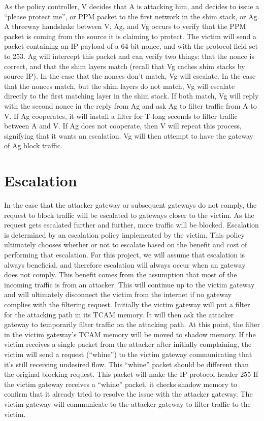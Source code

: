 \documentclass[11pt]{article}
\begin{document}
As the policy controller, V decides that A is attacking him, and decides to
issue a “please protect me”, or PPM packet to the first network in the shim
stack, or Ag. A threeway handshake between V, Ag, and Vg occurs to verify that
the PPM packet is coming from the source it is claiming to protect. The victim
will send a packet containing an IP payload of a 64 bit nonce, and with the
protocol field set to 253. Ag will intercept this packet and can verify two
things: that the nonce is correct, and that the shim layers match (recall that
Vg caches shim stacks by source IP). In the case that the nonces don’t match,
Vg will escalate. In the case that the nonces match, but the shim layers do not
match, Vg will escalate directly to the first matching layer in the shim stack.
If both match, Vg will reply with the second nonce in the reply from Ag and ask
Ag to filter traffic from A to V. If Ag cooperates, it will install a filter
for T-long seconds to filter traffic between A and V. If Ag does not cooperate,
then V will repeat this process, signifying that it wants an escalation. Vg
will then attempt to have the gateway of Ag block traffic. 


\section{Escalation}
In the case that the attacker gateway or subsequent gateways do not comply, the
request to block traffic will be escalated to gateways closer to the victim. As
the request gets escalated further and further, more traffic will be blocked.
Escalation is determined by an escalation policy implemented by the victim.
This policy ultimately chooses whether or not to escalate based on the benefit
and cost of performing that escalation. For this project, we will assume that
escalation is always beneficial, and therefore escalation will always occur
when an gateway does not comply. This benefit comes from the assumption that
most of the incoming traffic is from an attacker. This will continue up to the
victim gateway and will ultimately disconnect the victim from the internet if
no gateway complies with the filtering request. Initially the victim gateway
will put a filter for the attacking path in its TCAM memory. It will then ask
the attacker gateway to temporarily filter traffic on the attacking path. At
this point, the filter in the victim gateway’s TCAM memory will be moved to
shadow memory. If the victim receives a single packet from the attacker after
initially complaining, the victim will send a request (“whine”) to the victim
gateway communicating that it’s still receiving undesired flow. This “whine”
packet should be different than the original blocking request. This packet will
make the IP protocol header 255 If the victim gateway receives a “whine”
packet, it checks shadow memory to confirm that it already tried to resolve the
issue with the attacker gateway. The victim gateway will communicate to the
attacker gateway to filter traffic to the victim.
\end{document}
